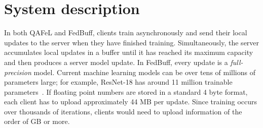 \documentclass[nohyperref]{article}
\theoremstyle{plain}
\theoremstyle{definition}
\theoremstyle{remark}
\newcommand{\algname}{{QAFeL}\xspace} %
\begin{document}
\section{System description}
\label{sec:system}
In both \algname and FedBuff, clients train asynchronously and send their local updates to the server when they have finished training.
Simultaneously, the server accumulates local updates in a buffer until it has reached its maximum capacity and then produces a server model update.
In FedBuff, every update is a \emph{full-precision} model.
Current machine learning models can be over tens of millions of parameters large; for example, ResNet-18 has around 11 million trainable parameters~\cite{resnet}.
If floating point numbers are stored in a standard 4 byte format, each client has to upload approximately 44 MB per update.
Since training occurs over thousands of iterations, clients would need to upload information of the order of GB or more.
\end{document}

